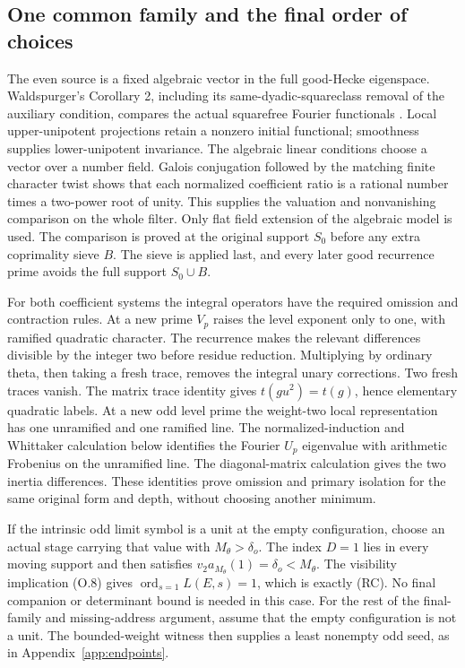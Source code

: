 \documentclass[11pt]{article}
\theoremstyle{definition}
\theoremstyle{remark}
\newcommand{\ord}{\operatorname{ord}}
\begin{document}
\subsection{One common family and the final order of choices}
The even source is a fixed algebraic vector in the full good-Hecke
eigenspace. Waldspurger's Corollary 2, including its same-dyadic-squareclass
removal of the auxiliary condition, compares the actual squarefree
Fourier functionals \cite{waldspurger}. Local upper-unipotent projections
retain a nonzero initial functional; smoothness supplies lower-unipotent
invariance. The algebraic linear conditions choose a vector over a
number field. Galois conjugation followed by the matching finite
character twist shows that each normalized coefficient ratio is a
rational number times a two-power root of unity. This supplies the
valuation and nonvanishing comparison on the whole filter.
Only flat field extension of the algebraic model is used.
The comparison is proved at the original support $S_0$ before any extra
coprimality sieve $B$. The sieve is applied last, and every later good
recurrence prime avoids the full support $S_0\cup B$.

For both coefficient systems the integral operators have the required
omission and contraction rules. At a new prime $V_p$ raises the level
exponent only to one, with ramified quadratic character. The recurrence
makes the relevant differences divisible by the integer two before
residue reduction. Multiplying by ordinary theta, then taking a fresh
trace, removes the integral unary corrections. Two fresh traces vanish.
The matrix trace identity gives $t(gu^2)=t(g)$, hence elementary
quadratic labels. At a new odd level prime the weight-two local representation
has one unramified and one ramified line. The normalized-induction
and Whittaker calculation below identifies the Fourier $U_p$
eigenvalue with arithmetic Frobenius on the unramified line.
The diagonal-matrix calculation gives the two inertia differences.
These identities prove omission and primary isolation for the same
original form and depth, without choosing another minimum.

If the intrinsic odd limit symbol is a unit at the empty configuration,
choose an actual stage carrying that value with $M_\theta>\delta_o$.
The index $D=1$ lies in every moving support and then satisfies
$v_2a_{M_\theta}(1)=\delta_o<M_\theta$. The visibility implication
(O.8) gives $\ord_{s=1}L(E,s)=1$, which is exactly (RC).
No final companion or determinant bound is needed in this case.
For the rest of the final-family and missing-address argument, assume
that the empty configuration is not a unit. The bounded-weight witness
then supplies a least nonempty odd seed, as in
Appendix~\ref{app:endpoints}.
\end{document}
